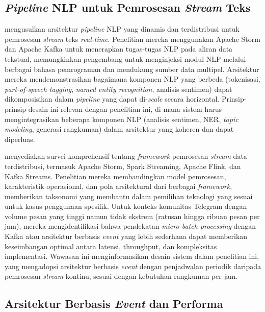 \subsection{\textit{Pipeline} NLP untuk Pemrosesan \textit{Stream} Teks}

\textcite{hamidi2021} mengusulkan arsitektur \textit{pipeline} NLP yang dinamis dan terdistribusi untuk pemrosesan \textit{stream} teks \textit{real-time}. Penelitian mereka menggunakan Apache Storm dan Apache Kafka untuk menerapkan tugas-tugas NLP pada aliran data tekstual, memungkinkan pengembang untuk menginjeksi modul NLP melalui berbagai bahasa pemrograman dan mendukung sumber data multipel. Arsitektur mereka mendemonstrasikan bagaimana komponen NLP yang berbeda (tokenisasi, \textit{part-of-speech tagging}, \textit{named entity recognition}, analisis sentimen) dapat dikomposisikan dalam \textit{pipeline} yang dapat di-\textit{scale} secara horizontal. Prinsip-prinsip desain ini relevan dengan penelitian ini, di mana sistem harus mengintegrasikan beberapa komponen NLP (analisis sentimen, NER, \textit{topic modeling}, generasi rangkuman) dalam arsitektur yang koheren dan dapat diperluas.

\textcite{isah2019} menyediakan survei komprehensif tentang \textit{framework} pemrosesan \textit{stream} data terdistribusi, termasuk Apache Storm, Spark Streaming, Apache Flink, dan Kafka Streams. Penelitian mereka membandingkan model pemrosesan, karakteristik operasional, dan pola arsitektural dari berbagai \textit{framework}, memberikan taksonomi yang membantu dalam pemilihan teknologi yang sesuai untuk kasus penggunaan spesifik. Untuk konteks komunitas Telegram dengan volume pesan yang tinggi namun tidak ekstrem (ratusan hingga ribuan pesan per jam), mereka mengidentifikasi bahwa pendekatan \textit{micro-batch processing} dengan Kafka atau arsitektur berbasis \textit{event} yang lebih sederhana dapat memberikan keseimbangan optimal antara latensi, throughput, dan kompleksitas implementasi. Wawasan ini menginformasikan desain sistem dalam penelitian ini, yang mengadopsi arsitektur berbasis \textit{event} dengan penjadwalan periodik daripada pemrosesan \textit{stream} kontinu, sesuai dengan kebutuhan rangkuman per jam.

\subsection{Arsitektur Berbasis \textit{Event} dan Performa}

